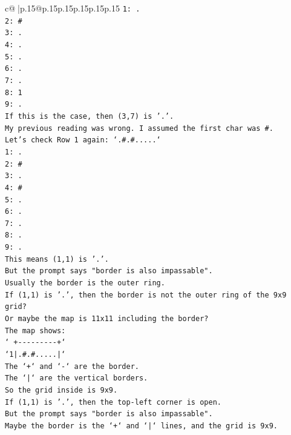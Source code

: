 \documentclass{article}
\begin{document}
{\begin{supertabular}{c@{$\;$}|p{.15\linewidth}@{}p{.15\linewidth}p{.15\linewidth}p{.15\linewidth}p{.15\linewidth}p{.15\linewidth}}
{{{\texttt{1: .} \\
\texttt{2: \#} \\
\texttt{3: .} \\
\texttt{4: .} \\
\texttt{5: .} \\
\texttt{6: .} \\
\texttt{7: .} \\
\texttt{8: 1} \\
\texttt{9: .} \\
\texttt{If this is the case, then (3,7) is '.'.} \\
\texttt{My previous reading was wrong. I assumed the first char was \#.} \\
\texttt{Let's check Row 1 again: `.\#.\#.....`} \\
\texttt{1: .} \\
\texttt{2: \#} \\
\texttt{3: .} \\
\texttt{4: \#} \\
\texttt{5: .} \\
\texttt{6: .} \\
\texttt{7: .} \\
\texttt{8: .} \\
\texttt{9: .} \\
\texttt{This means (1,1) is '.'.} \\
\texttt{But the prompt says "border is also impassable".} \\
\texttt{Usually the border is the outer ring.} \\
\texttt{If (1,1) is '.', then the border is not the outer ring of the 9x9 grid?} \\
\texttt{Or maybe the map is 11x11 including the border?} \\
\texttt{The map shows:} \\
\texttt{` +{-}{-}{-}{-}{-}{-}{-}{-}{-}+`} \\
\texttt{`1|.\#.\#.....|`} \\
\texttt{The `+` and `{-}` are the border.} \\
\texttt{The `|` are the vertical borders.} \\
\texttt{So the grid inside is 9x9.} \\
\texttt{If (1,1) is '.', then the top{-}left corner is open.} \\
\texttt{But the prompt says "border is also impassable".} \\
\texttt{Maybe the border is the `+` and `|` lines, and the grid is 9x9.} \\
}}}
\end{supertabular}}
\end{document}
